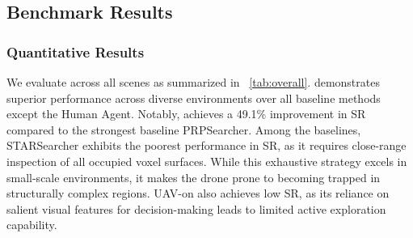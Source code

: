 \subsection{Benchmark Results}\label{VI-B}
\subsubsection{Quantitative Results}
We evaluate \sysname across all scenes as summarized in \tab~\ref{tab:overall}. \sysname demonstrates superior performance across diverse environments over all baseline methods except the Human Agent. Notably, \sysname achieves a 49.1\% improvement in SR compared to the strongest baseline PRPSearcher. 
Among the baselines, STARSearcher exhibits the poorest performance in SR, as it requires close-range inspection of all occupied voxel surfaces. 
While this exhaustive strategy excels in small-scale environments, it makes the drone prone to becoming trapped in structurally complex regions. UAV-on also achieves low SR, as its reliance on salient visual features for decision-making leads to limited active exploration capability.

